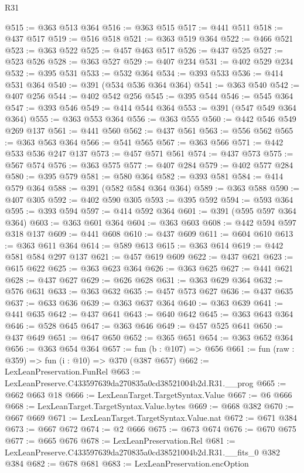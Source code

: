 \begin{lexlean}{R31}
\begin{coremodule}
@515 := @363 @513 @364
@516 := @363 @515
@517 := @441 @511
@518 := @437 @517
@519 := @516 @518
@521 := @363 @519 @364
@522 := @466 @521
@523 := @363 @522
@525 := @457 @463 @517
@526 := @437 @525
@527 := @523 @526
@528 := @363 @527
@529 := @407 @234
@531 := @402 @529 @234
@532 := @395 @531
@533 := @532 @364
@534 := @393 @533
@536 := @414 @531 @364
@540 := @391 (@534 @536 @364 @364)
@541 := @363 @540
@542 := @407 @256
@544 := @402 @542 @256
@545 := @395 @544
@546 := @545 @364
@547 := @393 @546
@549 := @414 @544 @364
@553 := @391 (@547 @549 @364 @364)
@555 := @363 @553 @364
@556 := @363 @555
@560 := @442 @546 @549 @269 @137
@561 := @441 @560
@562 := @437 @561
@563 := @556 @562
@565 := @363 @563 @364
@566 := @541 @565
@567 := @363 @566
@571 := @442 @533 @536 @247 @137
@573 := @457 @571 @561
@574 := @437 @573
@575 := @567 @574
@576 := @363 @575
@577 := @407 @284
@579 := @402 @577 @284
@580 := @395 @579
@581 := @580 @364
@582 := @393 @581
@584 := @414 @579 @364
@588 := @391 (@582 @584 @364 @364)
@589 := @363 @588
@590 := @407 @305
@592 := @402 @590 @305
@593 := @395 @592
@594 := @593 @364
@595 := @393 @594
@597 := @414 @592 @364
@601 := @391 (@595 @597 @364 @364)
@603 := @363 @601 @364
@604 := @363 @603
@608 := @442 @594 @597 @318 @137
@609 := @441 @608
@610 := @437 @609
@611 := @604 @610
@613 := @363 @611 @364
@614 := @589 @613
@615 := @363 @614
@619 := @442 @581 @584 @297 @137
@621 := @457 @619 @609
@622 := @437 @621
@623 := @615 @622
@625 := @363 @623 @364
@626 := @363 @625
@627 := @441 @621
@628 := @437 @627
@629 := @626 @628
@631 := @363 @629 @364
@632 := @576 @631
@633 := @363 @632
@635 := @457 @573 @627
@636 := @437 @635
@637 := @633 @636
@639 := @363 @637 @364
@640 := @363 @639
@641 := @441 @635
@642 := @437 @641
@643 := @640 @642
@645 := @363 @643 @364
@646 := @528 @645
@647 := @363 @646
@649 := @457 @525 @641
@650 := @437 @649
@651 := @647 @650
@652 := @365 @651
@654 := @363 @652 @364
@656 := @363 @654 @364
@657 := fun (b : @107) => @656
@661 := fun (raw : @359) => fun (i : @10) => @370 (@387 @657)
@662 := LexLeanPreservation.FunRel
@663 := LexLeanPreserve.C433597639da270835a0cd38521004b2d.R31.__prog
@665 := @662 @663 @18
@666 := LexLeanTarget.TargetSyntax.Value
@667 := @6 @666
@668 := LexLeanTarget.TargetSyntax.Value.bytes
@669 := @668 @382
@670 := @667 @669
@671 := LexLeanTarget.TargetSyntax.Value.nat
@672 := @671 @384
@673 := @667 @672
@674 := @2 @666
@675 := @673 @674
@676 := @670 @675
@677 := @665 @676
@678 := LexLeanPreservation.Rel
@681 := LexLeanPreserve.C433597639da270835a0cd38521004b2d.R31.__fits_0 @382 @384
@682 := @678 @681
@683 := LexLeanPreservation.encOption

\end{coremodule}
\end{lexlean}
